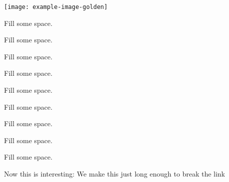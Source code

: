 \documentclass[a5paper,twocolumn]{scrartcl}
\begin{document}
  \begin{figure*}[t]
    \texttt{[image: example-image-golden]}
  \end{figure*}
  \lipsum[1]
  \lipsum[1]
  \lipsum[2]
  Fill some space.\par
  Fill some space.\par
  Fill some space.\par
  Fill some space.\par
  Fill some space.\par
  Fill some space.\par
  Fill some space.\par
  Fill some space.\par
  Fill some space.\par
  Now this is interesting: We make this just long enough to break the link
  \citep{strunk-and-white}
  
\end{document}
